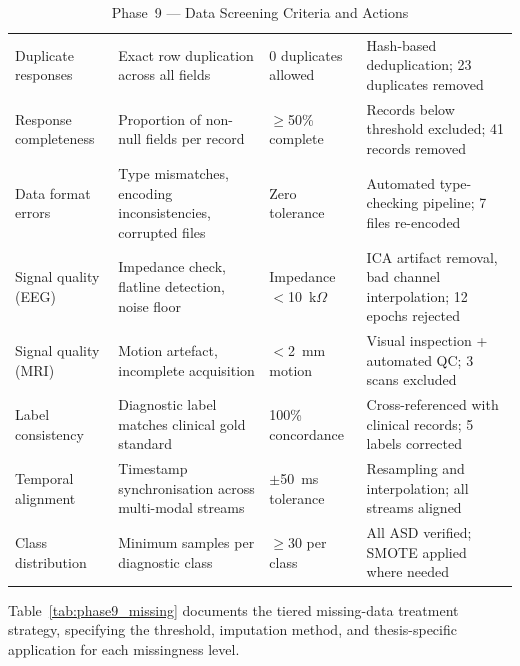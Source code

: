 \begingroup\singlespacing\tablefontsize\tablestripes
\begin{xltabular}{\textwidth}{@{} l X l X @{}}
\caption{Phase~9 --- Data Screening Criteria and Actions}
\label{tab:phase9_screening}\\
\toprule
{} &  &  &  \\
\midrule
\endfirsthead
\endhead
\bottomrule
\endlastfoot
Duplicate responses      & Exact row duplication across all fields                    & 0 duplicates allowed  & Hash-based deduplication; 23 duplicates removed \\
\addlinespace
Response completeness    & Proportion of non-null fields per record                   & $\geq$50\% complete   & Records below threshold excluded; 41 records removed \\
\addlinespace
Data format errors       & Type mismatches, encoding inconsistencies, corrupted files & Zero tolerance        & Automated type-checking pipeline; 7 files re-encoded \\
\addlinespace
Signal quality (EEG)     & Impedance check, flatline detection, noise floor           & Impedance $<$10~k$\Omega$ & ICA artifact removal, bad channel interpolation; 12 epochs rejected \\
\addlinespace
Signal quality (MRI)     & Motion artefact, incomplete acquisition                    & $<$2~mm motion        & Visual inspection + automated QC; 3 scans excluded \\
\addlinespace
Label consistency        & Diagnostic label matches clinical gold standard            & 100\% concordance     & Cross-referenced with clinical records; 5 labels corrected \\
\addlinespace
Temporal alignment       & Timestamp synchronisation across multi-modal streams       & $\pm$50~ms tolerance  & Resampling and interpolation; all streams aligned \\
\addlinespace
Class distribution       & Minimum samples per diagnostic class                       & $\geq$30 per class    & All ASD verified; SMOTE applied where needed \\
\end{xltabular}
\endgroup

\vspace{1.5em}

Table~\ref{tab:phase9_missing} documents the tiered missing-data treatment strategy, specifying the threshold, imputation method, and thesis-specific application for each missingness level.

